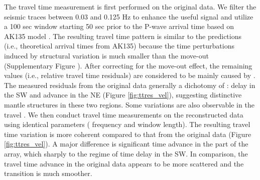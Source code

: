 The travel time measurement is first performed on the original data. We filter the seismic traces between 0.03 and 0.125 Hz to enhance the useful signal and utilize a 100 sec  window starting 50 sec prior to the  P-wave arrival time based on AK135 model \cite[]{kennett1995constraints}. The resulting travel time pattern is similar to the predictions (i.e., theoretical arrival times from AK135) because the time perturbations induced by structural variation is much smaller than the move-out (Supplementary Figure \color{blue}{13}\color{black}{}). After correcting for the move-out effect, the remaining values (i.e., relative travel time residuals) are considered to be mainly caused by . The measured residuals from the original data generally  a dichotomy of : delay in the SW and advance in the NE (Figure \ref{fig:ttres_vel}\color{blue}{(a)}\color{black}{}), suggesting distinctive mantle structures in these two regions.  Some  variations are also observable in the travel . We then conduct travel time measurements on the reconstructed data using identical parameters ( frequency and window length).   The resulting travel time variation is more coherent compared to that from the original data (Figure \ref{fig:ttres_vel}\color{blue}{(b)}\color{black}{}). A major difference is  significant time advance in the  part of the array, which  sharply to the regime of time delay in the SW.   In comparison, the travel time advance in the original data appears to be more scattered and the transition is much smoother. 

